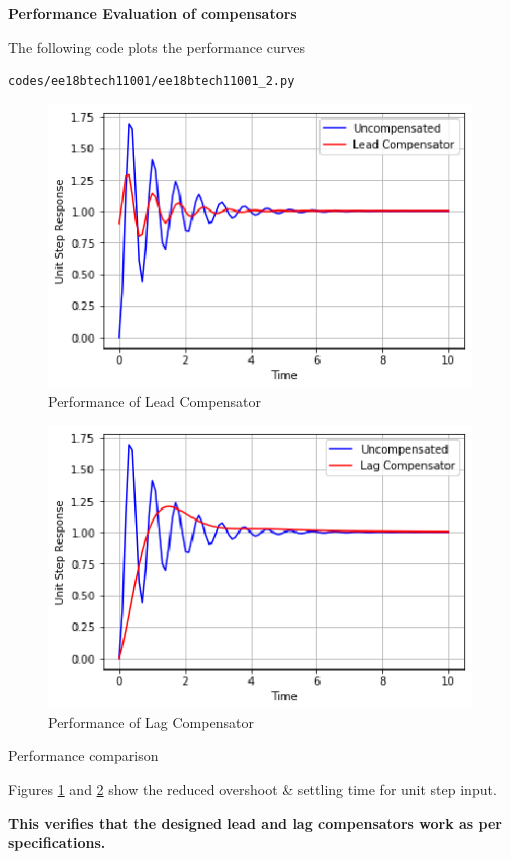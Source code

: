 \textbf{Performance Evaluation of compensators}

The following code plots the performance curves

\begin{lstlisting}[frame=single]
codes/ee18btech11001/ee18btech11001_2.py
\end{lstlisting}
\begin{figure}[!ht]
\centering
    \includegraphics[width=\columnwidth]{./figs/ee18btech11001/ee18btech11001_4.eps}
  \caption{Performance of Lead Compensator}
  \label{fig:ee18btech11001_fig4}
\end{figure}
\begin{figure}[!ht]
\centering
    \includegraphics[width=\columnwidth]{./figs/ee18btech11001/ee18btech11001_5.eps}
  \caption{Performance of Lag Compensator}
  \label{fig:ee18btech11001_fig5}
\end{figure}

\begin{table}[!ht]
\centering

\caption{Performance comparison}
\label{table:ee18btech11001_2}
\end{table}
Figures \ref{fig:ee18btech11001_fig4} and \ref{fig:ee18btech11001_fig5} show the reduced overshoot \& settling time for unit step input. 

\textbf{\newline This verifies that the designed lead and lag compensators work as per specifications.} 
